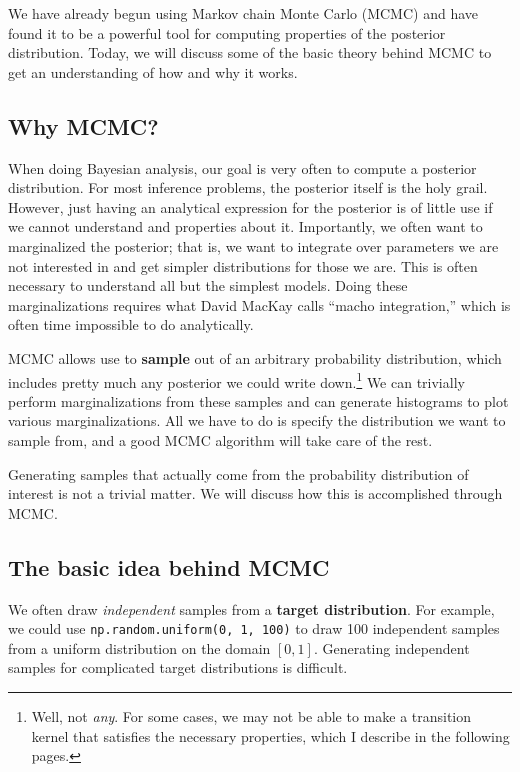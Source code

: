 We have already begun using Markov chain Monte Carlo (MCMC) and have
found it to be a powerful tool for computing properties of the
posterior distribution.  Today, we will discuss some of the basic
theory behind MCMC to get an understanding of how and why it works.

\subsection{Why MCMC?}
When doing Bayesian analysis, our goal is very often to compute a
posterior distribution.  For most inference problems, the posterior
itself is the holy grail.  However, just having an analytical
expression for the posterior is of little use if we cannot understand
and properties about it.  Importantly, we often want to marginalized
the posterior; that is, we want to integrate over parameters we are
not interested in and get simpler distributions for those we are.
This is often necessary to understand all but the simplest models.
Doing these marginalizations requires what David MacKay calls ``macho
integration,'' which is often time impossible to do analytically.

MCMC allows use to \textbf{sample} out of an arbitrary probability
distribution, which includes pretty much any posterior we could write
down.\footnote{Well, not \textit{any}.  For some cases, we may not be
  able to make a transition kernel that satisfies the necessary
  properties, which I describe in the following pages.}  We can
trivially perform marginalizations from these samples and can generate
histograms to plot various marginalizations.  All we have to do is
specify the distribution we want to sample from, and a good MCMC
algorithm will take care of the rest.

Generating samples that actually come from the probability
distribution of interest is not a trivial matter.  We will discuss how
this is accomplished through MCMC.


\subsection{The basic idea behind MCMC}
We often draw \textit{independent} samples from a \textbf{target
  distribution}.  For example, we could use
\verb|np.random.uniform(0, 1, 100)| to draw 100 independent samples
from a uniform distribution on the domain $[0,1]$.  Generating
independent samples for complicated target distributions is difficult.

